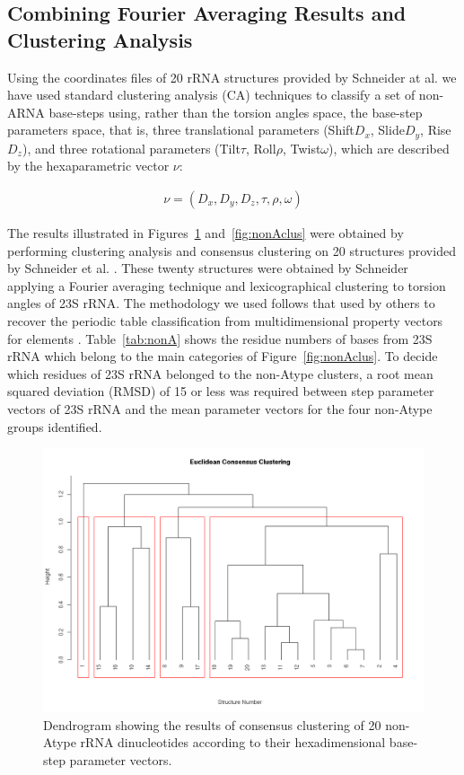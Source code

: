 \subsection{Combining Fourier Averaging Results and Clustering Analysis}
Using the coordinates files of 20 rRNA structures provided by 
Schneider at al.\cite{schneider2004}  we have
used standard clustering analysis (CA) techniques to classify a set of
non-ARNA base-steps  using, rather than the torsion  angles space, the
base-step  parameters space, that  is, three  translational parameters
(Shift$D_x$, Slide$D_y$,  Rise$D_z$), and three  rotational parameters
(Tilt$\tau$,  Roll$\rho$, Twist$\omega$), which  are described  by the
hexaparametric vector $\nu$:

\begin{gather}
 \nu = (D_x, D_y, D_z, \tau, \rho, \omega)
\end{gather}

The     results      illustrated     in     Figures~\ref{fig:eucl_cons}
and~\ref{fig:nonAclus} were  obtained   by   performing  clustering
analysis  and  consensus  clustering  on  20  structures  provided  by
Schneider et  al.  \cite{schneider2004}. These  twenty structures were
obtained  by  Schneider applying  a  Fourier  averaging technique  and
lexicographical  clustering  to  torsion  angles  of  23S  rRNA.   The
methodology  we  used follows  that  used  by  others to  recover  the
periodic table  classification from multidimensional  property vectors
for  elements \cite{restrepo2004,  restrepo2006}. Table~\ref{tab:nonA}
shows the residue  numbers of bases from 23S rRNA  which belong to the
main  categories   of  Figure~\ref{fig:nonAclus}.   To   decide  which
residues of  23S rRNA belonged to  the non-Atype clusters,  a root mean
squared  deviation (RMSD) of  15  or  less  was required  between  step
parameter vectors of  23S rRNA and the mean  parameter vectors for the 
four non-Atype groups identified.

\begin{figure}[htbp]
 \centering
\includegraphics[angle=90, scale=0.6]{eucli_cons_nonA-RNA.png}
\caption{Dendrogram showing the results  of consensus clustering of 20
non-Atype  rRNA  dinucleotides   according  to  their  hexadimensional
base-step parameter vectors.}
 \label{fig:eucl_cons}
\end{figure}

